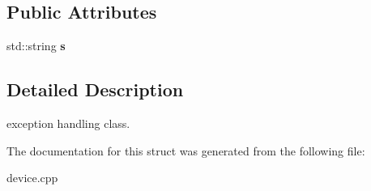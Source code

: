 \subsection*{Public Attributes}
\begin{DoxyCompactItemize}
\item 
\mbox{\label{structMyException_a99afdf5c0f4a14da793d7487ce398e3e}} 
std\+::string {\bfseries s}
\end{DoxyCompactItemize}


\subsection{Detailed Description}
exception handling class. 

The documentation for this struct was generated from the following file\+:\begin{DoxyCompactItemize}
\item 
device.\+cpp\end{DoxyCompactItemize}
